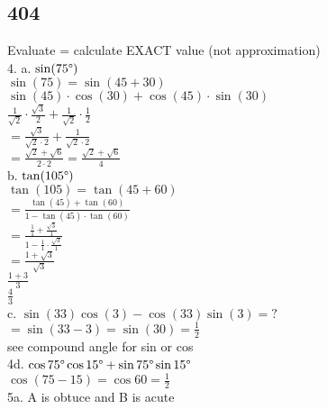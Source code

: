 \documentclass{article}
\begin{document}
  \subsection{404}
  Evaluate = calculate EXACT value (not approximation)\\
  4. a. $\sin(75\degree)$\\
  $\sin(75)=\sin(45+30)$\\
  $\sin(45)\cdot\cos(30)+\cos(45)\cdot\sin(30)$\\
  $\frac{1}{\sqrt{2}}\cdot\frac{\sqrt{3}}{2}+\frac{1}{\sqrt{2}}\cdot\frac{1}{2}$\\ 
  $=\frac{\sqrt{3}}{\sqrt{2}\cdot2}+\frac{1}{\sqrt{2}\cdot2}$\\
  $=\frac{\sqrt{2}+\sqrt{6}}{2\cdot2}=\frac{\sqrt{2}+\sqrt{6}}{4}$\\
  b. $\tan(105\degree)$\\
  $\tan(105)=\tan(45+60)$\\
  $=\frac{\tan(45)+\tan(60)}{1-\tan(45)\cdot\tan(60)}$\\
  $=\frac{\frac{1}{1}+\frac{\sqrt{3}}{1}}{1-\frac{1}{1}\cdot\frac{\sqrt{3}}{1}}$\\
  $=\frac{1+\sqrt{3}}{\sqrt{3}}$\\
  $\frac{1+3}{3}$\\
  $\frac{4}{3}$\\
  c. $\sin(33)\cos(3)-\cos(33)\sin(3)=?$\\
  $=\sin(33-3)=\sin(30)=\frac{1}{2}$\\
  see compound angle for sin or cos\\
  4d. $\cos75\degree\cos15\degree+\sin75\degree\sin15\degree$\\
  $\cos(75-15)=\cos60=\frac{1}{2}$\\
  5a. A is obtuce and B is acute 
\end{document}
